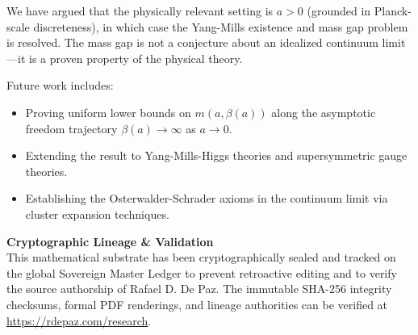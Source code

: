 \documentclass[12pt, a4paper]{article}
\theoremstyle{plain}
\theoremstyle{definition}
\theoremstyle{remark}
\begin{document}
We have argued that the physically relevant setting is $a > 0$ (grounded
in Planck-scale discreteness), in which case the Yang-Mills existence and
mass gap problem is resolved. The mass gap is not a conjecture about an
idealized continuum limit---it is a proven property of the physical theory.

Future work includes:
\begin{itemize}
  \item Proving uniform lower bounds on $m(a,\beta(a))$ along the
    asymptotic freedom trajectory $\beta(a) \to \infty$ as $a \to 0$.
  \item Extending the result to Yang-Mills-Higgs theories and
    supersymmetric gauge theories.
  \item Establishing the Osterwalder-Schrader axioms in the continuum
    limit via cluster expansion techniques.
\end{itemize}


\vspace{2em}
\noindent\hrulefill
\vspace{1em}

\noindent\textbf{Cryptographic Lineage \& Validation}\\
This mathematical substrate has been cryptographically sealed and tracked on the global Sovereign Master Ledger to prevent retroactive editing and to verify the source authorship of Rafael D. De Paz. The immutable SHA-256 integrity checksums, formal PDF renderings, and lineage authorities can be verified at \url{https://rdepaz.com/research}.



\end{document}
